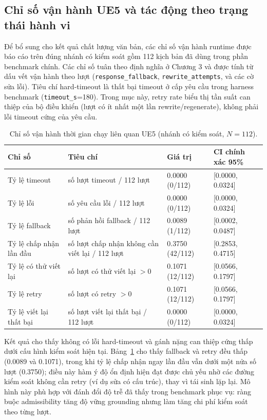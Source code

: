 ﻿\documentclass[a4paper,12pt]{article}
\begin{document}
\subsection{Chỉ số vận hành UE5 và tác động theo trạng thái hành vi}
Để bổ sung cho kết quả chất lượng văn bản, các chỉ số vận hành runtime được báo cáo trên đúng nhánh có kiểm soát gồm 112 kịch bản đã dùng trong phần benchmark chính. Các chỉ số tuân theo định nghĩa ở Chương 3 và được tính từ dấu vết vận hành theo lượt (\texttt{response\_fallback}, \texttt{rewrite\_attempts}, và các cờ sửa lỗi). Tiêu chí hard-timeout là thất bại timeout ở cấp yêu cầu trong harness benchmark (\texttt{timeout\_s}=180). Trong mục này, retry rate biểu thị tần suất can thiệp của bộ điều khiển (lượt có ít nhất một lần rewrite/regenerate), không phải lỗi timeout cứng của yêu cầu.

\begin{table}[t]
\centering
\caption{Chỉ số vận hành thời gian chạy liên quan UE5 (nhánh có kiểm soát, \(N=112\)).}
\label{tab:ue5_operational_metrics}
\begingroup
\footnotesize
\setlength{\tabcolsep}{4pt}
\begin{tabular}{p{}p{}p{}p{}}
\toprule
Chỉ số & Tiêu chí & Giá trị & CI chính xác 95\% \\
\midrule
Tỷ lệ timeout & số lượt timeout / 112 lượt & 0.0000 (0/112) & [0.0000, 0.0324] \\
Tỷ lệ lỗi & số yêu cầu lỗi / 112 lượt & 0.0000 (0/112) & [0.0000, 0.0324] \\
Tỷ lệ fallback & số phản hồi fallback / 112 lượt & 0.0089 (1/112) & [0.0002, 0.0487] \\
Tỷ lệ chấp nhận lần đầu & số lượt chấp nhận không cần viết lại / 112 lượt & 0.3750 (42/112) & [0.2853, 0.4715] \\
Tỷ lệ có thử viết lại & số lượt có thử viết lại \(>0\) & 0.1071 (12/112) & [0.0566, 0.1797] \\
Tỷ lệ retry & số lượt có retry \(>0\) & 0.1071 (12/112) & [0.0566, 0.1797] \\
Tỷ lệ viết lại thất bại & số lượt viết lại thất bại / 112 lượt & 0.0000 (0/112) & [0.0000, 0.0324] \\
\bottomrule
\end{tabular}
\endgroup
\end{table}

Kết quả cho thấy không có lỗi hard-timeout và gánh nặng can thiệp cứng thấp dưới cấu hình kiểm soát hiện tại. Bảng~\ref{tab:ue5_operational_metrics} cho thấy fallback và retry đều thấp (0.0089 và 0.1071), trong khi tỷ lệ chấp nhận ngay lần đầu vẫn dưới một nửa số lượt (0.3750); điều này hàm ý độ ổn định hiện đạt được chủ yếu nhờ các đường kiểm soát không cần retry (ví dụ sửa có cấu trúc), thay vì tái sinh lặp lại. Mô hình này phù hợp với đánh đổi độ trễ đã thấy trong benchmark phục vụ: ràng buộc admissibility tăng độ vững grounding nhưng làm tăng chi phí kiểm soát theo từng lượt.
\end{document}
